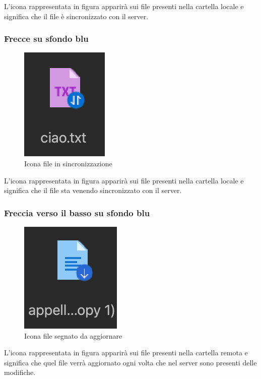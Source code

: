 L'icona rappresentata in figura apparirà sui file presenti nella cartella locale e significa che il file è sincronizzato con il server.
\subsubsection{Frecce su sfondo blu}

\begin{figure}[H]
    \centering
    \includegraphics[scale = 1.6]{components/img/iconSync.png}
    \caption{Icona file in sincronizzazione}
    \label{fig:bluedownI}
\end{figure}

L'icona rappresentata in figura apparirà sui file presenti nella cartella locale e significa che il file sta venendo sincronizzato con il server.

\subsubsection{Freccia verso il basso su sfondo blu}

\begin{figure}[H]
    \centering
    \includegraphics[scale = 0.8]{components/img/iconUpdate.png}
    \caption{Icona file segnato da aggiornare}
    \label{fig:greenI}
\end{figure}


L'icona rappresentata in figura apparirà sui file presenti nella cartella remota e significa che quel file verrà aggiornato ogni volta che nel server sono presenti delle modifiche.

